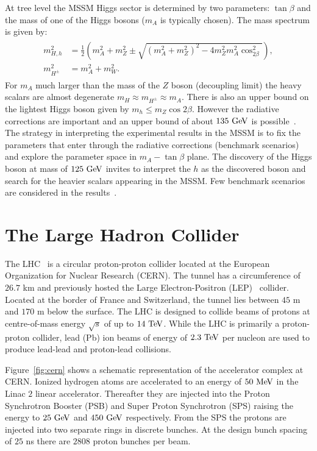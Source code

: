 At tree level the MSSM Higgs sector is determined by two parameters: $\tan \beta$ and the mass of one of the Higgs bosons ($m_{A}$ is typically chosen). The mass spectrum is given by:
\begin{eqnarray} \label{eq:mssm_mass}
\begin{aligned}
m_{H,h}^2 &= \frac{1}{2} (m_A^2 + m_Z^2 \pm \sqrt{(m_A^2+m_Z^2)^2-4m_Z^2m_A^2\cos^2_{2\beta}}), \\
m_{H^{\pm}}^2 &= m_{A}^2 + m_{W}^2.
\end{aligned}
\end{eqnarray}   
For $m_{A}$ much larger than the mass of the $Z$ boson (decoupling limit) the heavy scalars are almost degenerate $m_{H} \approx m_{H^{\pm}} \approx m_{A}$. There is also an upper bound on the lightest Higgs boson given by $m_{h} \leq m_{Z} \cos 2\beta$. However the radiative corrections are important and an upper bound of about $135~\mathrm{Ge\kern -0.1em V}$ is possible~\cite{Degrassi:2002fi}. The strategy in interpreting the experimental results in the MSSM is to fix the parameters that enter through the radiative corrections (benchmark scenarios) and explore the parameter space in $m_{A}-\tan \beta$ plane. The discovery of the Higgs boson at mass of $125~\mathrm{Ge\kern -0.1em V}$ invites to interpret the $h$ as the discovered boson and search for the heavier scalars appearing in the MSSM. Few benchmark scenarios are considered in the results~\cite{Heinemeyer:2011aa,Carena:2013ytb}.

\section{The Large Hadron Collider}
The LHC~\cite{1748-0221-3-08-S08001} is a circular proton-proton collider located at the European Organization for Nuclear Research (CERN). The tunnel has a circumference of $26.7$ km and previously hosted the Large Electron-Positron (LEP)~\cite{lep1,lep2} collider. Located at the border of France and Switzerland, the tunnel lies between $45$ m and $170$ m below the surface. The LHC is designed to collide beams of protons at centre-of-mass energy $\sqrt{s}$ of up to $14~\mathrm{Te\kern -0.1em V}$. While the LHC is primarily a proton-proton collider, lead (Pb) ion beams of energy of $2.3~\mathrm{Te\kern -0.1em V}$ per nucleon are used to produce lead-lead  and proton-lead collisions.  
 
Figure~\ref{fig:cern} shows a schematic representation of the accelerator complex at CERN. Ionized hydrogen atoms are accelerated to an energy of $50~\mathrm{Me\kern -0.1em V}$ in the Linac $2$ linear accelerator. Thereafter they are injected into the Proton Synchrotron Booster (PSB) and Super Proton Synchrotron (SPS) raising the energy to $25~\mathrm{Ge\kern -0.1em V}$ and $450~\mathrm{Ge\kern -0.1em V}$ respectively. From the SPS the protons are injected into two separate rings in discrete bunches. At the design bunch spacing of $25$ ns there are $2808$ proton bunches per beam. 

